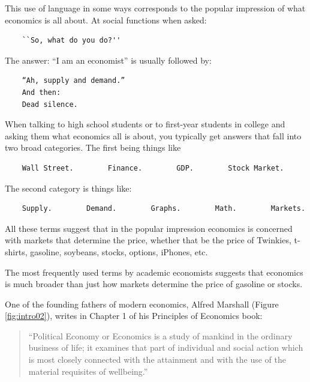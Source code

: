 \documentclass[
]{book}
\begin{document}
This use of language in some ways corresponds to the popular impression of what economics is all about. At social functions when asked:

\begin{verbatim}
    ``So, what do you do?''
\end{verbatim}

The answer: ``I am an economist'' is usually followed by:

\begin{verbatim}
    “Ah, supply and demand.”
    And then:
    Dead silence.
\end{verbatim}

When talking to high school students or to first-year students in college and asking them what economics all is about, you typically get answers that fall into two broad categories. The first being things like

\begin{verbatim}
    Wall Street.        Finance.        GDP.        Stock Market.
\end{verbatim}

The second category is things like:

\begin{verbatim}
    Supply.        Demand.        Graphs.        Math.        Markets.
\end{verbatim}

All these terms suggest that in the popular impression economics is concerned with markets that determine the price, whether that be the price of Twinkies, t-shirts, gasoline, soybeans, stocks, options, iPhones, etc.

The most frequently used terms by academic economists suggests that economics is much broader than just how markets determine the price of gasoline or stocks.

One of the founding fathers of modern economics, Alfred Marshall (Figure \ref{fig:intro02}), writes in Chapter 1 of his Principles of Economics book:

\begin{quote}
``Political Economy or Economics is a study of mankind in the ordinary business of life; it examines that part of individual and social action which is most closely connected with the attainment and with the use of the material requisites of wellbeing.''
\end{quote}
\end{document}

